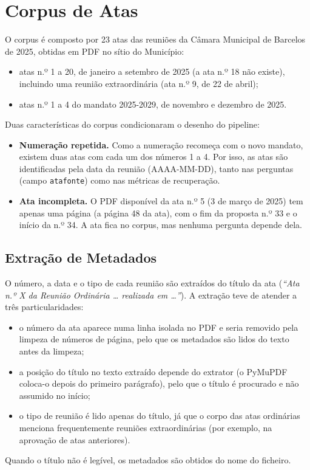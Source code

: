\documentclass[11pt]{article}
\renewcommand{\_}{\textunderscore\allowbreak}
\begin{document}
\section{Corpus de Atas}
\label{sec:corpus}

O corpus é composto por 23 atas das reuniões da Câmara Municipal de Barcelos de 2025, obtidas em PDF no sítio do Município:
\begin{itemize}
    \item atas n.º 1 a 20, de janeiro a setembro de 2025 (a ata n.º 18 não existe), incluindo uma reunião extraordinária (ata n.º 9, de 22 de abril);
    \item atas n.º 1 a 4 do mandato 2025-2029, de novembro e dezembro de 2025.
\end{itemize}

Duas características do corpus condicionaram o desenho do pipeline:
\begin{itemize}
    \item \textbf{Numeração repetida.} Como a numeração recomeça com o novo mandato, existem duas atas com cada um dos números 1 a 4. Por isso, as atas são identificadas pela data da reunião (AAAA-MM-DD), tanto nas perguntas (campo \texttt{ata\_fonte}) como nas métricas de recuperação.
    \item \textbf{Ata incompleta.} O PDF disponível da ata n.º 5 (3 de março de 2025) tem apenas uma página (a página 48 da ata), com o fim da proposta n.º 33 e o início da n.º 34. A ata fica no corpus, mas nenhuma pergunta depende dela.
\end{itemize}

\subsection{Extração de Metadados}

O número, a data e o tipo de cada reunião são extraídos do título da ata (\textit{``Ata n.º X da Reunião Ordinária \ldots{} realizada em \ldots''}). A extração teve de atender a três particularidades:
\begin{itemize}
    \item o número da ata aparece numa linha isolada no PDF e seria removido pela limpeza de números de página, pelo que os metadados são lidos do texto antes da limpeza;
    \item a posição do título no texto extraído depende do extrator (o PyMuPDF coloca-o depois do primeiro parágrafo), pelo que o título é procurado e não assumido no início;
    \item o tipo de reunião é lido apenas do título, já que o corpo das atas ordinárias menciona frequentemente reuniões extraordinárias (por exemplo, na aprovação de atas anteriores).
\end{itemize}
Quando o título não é legível, os metadados são obtidos do nome do ficheiro.
\end{document}
